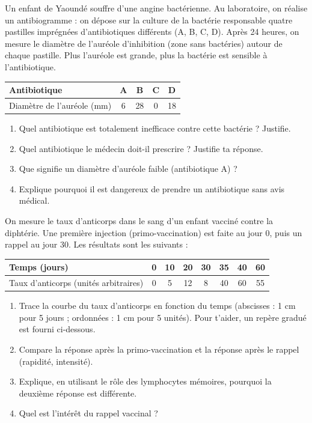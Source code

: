 \documentclass[11pt]{article}
\begin{document}
\begin{exercice}
Un enfant de Yaoundé souffre d'une angine bactérienne. Au laboratoire, on réalise un antibiogramme : on dépose sur la culture de la bactérie responsable quatre pastilles imprégnées d'antibiotiques différents (A, B, C, D). Après 24 heures, on mesure le diamètre de l'auréole d'inhibition (zone sans bactéries) autour de chaque pastille. Plus l'auréole est grande, plus la bactérie est sensible à l'antibiotique.
\begin{center}
\begin{tabular}{|l|c|c|c|c|}
\hline
\rowcolor{popblueL} Antibiotique & A & B & C & D \\
\hline
Diamètre de l'auréole (mm) & 6 & 28 & 0 & 18 \\
\hline
\end{tabular}
\end{center}
\begin{enumerate}
\item Quel antibiotique est totalement inefficace contre cette bactérie ? Justifie.
\item Quel antibiotique le médecin doit-il prescrire ? Justifie ta réponse.
\item Que signifie un diamètre d'auréole faible (antibiotique A) ?
\item Explique pourquoi il est dangereux de prendre un antibiotique sans avis médical.
\end{enumerate}
\end{exercice}

\begin{exercice}
On mesure le taux d'anticorps dans le sang d'un enfant vacciné contre la diphtérie. Une première injection (primo-vaccination) est faite au jour 0, puis un rappel au jour 30. Les résultats sont les suivants :
\begin{center}
\begin{tabular}{|l|c|c|c|c|c|c|c|}
\hline
\rowcolor{popblueL} Temps (jours) & 0 & 10 & 20 & 30 & 35 & 40 & 60 \\
\hline
Taux d'anticorps (unités arbitraires) & 0 & 5 & 12 & 8 & 40 & 60 & 55 \\
\hline
\end{tabular}
\end{center}
\begin{enumerate}
\item Trace la courbe du taux d'anticorps en fonction du temps (abscisses : 1 cm pour 5 jours ; ordonnées : 1 cm pour 5 unités). Pour t'aider, un repère gradué est fourni ci-dessous.
\item Compare la réponse après la primo-vaccination et la réponse après le rappel (rapidité, intensité).
\item Explique, en utilisant le rôle des lymphocytes mémoires, pourquoi la deuxième réponse est différente.
\item Quel est l'intérêt du rappel vaccinal ?
\end{enumerate}
\end{exercice}
\end{document}
